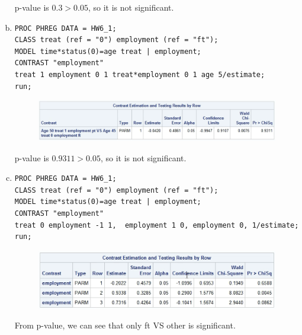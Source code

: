 \documentclass{elegantbook}
\begin{document}
\begin{solution}
\begin{enumerate}[(a)]
        p-value is $0.3>0.05$, so it is not significant.
        \item \begin{verbatim}
PROC PHREG DATA = HW6_1;
CLASS treat (ref = "0") employment (ref = "ft");
MODEL time*status(0)=age treat | employment;
CONTRAST "employment"
treat 1 employment 0 1 treat*employment 0 1 age 5/estimate;
run;
        \end{verbatim}
        \begin{figure}[H]
            \centering
            \includegraphics[width=.6\textwidth]{HW6_4.png}
        \end{figure}
        p-value is $0.9311>0.05$, so it is not significant.
        \item \begin{verbatim}
PROC PHREG DATA = HW6_1;
CLASS treat (ref = "0") employment (ref = "ft");
MODEL time*status(0)=age treat | employment;
CONTRAST "employment"
treat 0 employment -1 1,  employment 1 0, employment 0, 1/estimate;
run;
        \end{verbatim}
        \begin{figure}[H]
            \centering
            \includegraphics[width=.6\textwidth]{HW6_5.png}
        \end{figure}
        From p-value, we can see that only ft VS other is significant. 
    \end{enumerate}
\end{solution}
\end{document}
